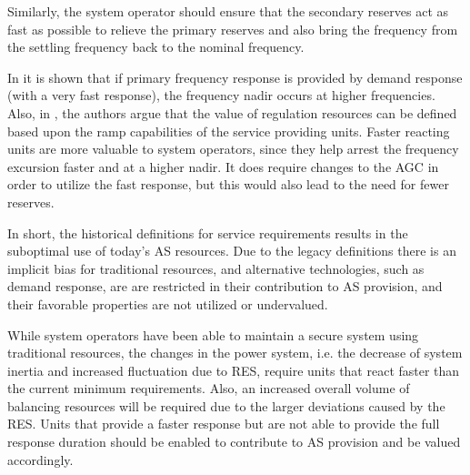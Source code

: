 Similarly, the system operator should ensure that the secondary reserves act as fast as possible to relieve the primary reserves and also bring the frequency from the settling frequency back to the nominal frequency.


In \cite{vrettos2015integrating} it is shown that if primary frequency response is provided by demand response (with a very fast response), the frequency nadir occurs at higher frequencies.
Also, in \cite{makarov2008assessing}, the authors argue that the value of regulation resources can be defined based upon the ramp capabilities of the service providing units. Faster reacting units are more valuable to system operators, since they help arrest the frequency excursion faster and at a higher nadir. It does require changes to the AGC in order to utilize the fast response, but this would also lead to the need for fewer reserves.

In short, the historical definitions for service requirements results in the suboptimal use of today's AS resources. Due to the legacy definitions there is an implicit %
bias for traditional resources, and alternative technologies, such as demand response, are are restricted in their contribution to AS provision, and their favorable properties are not utilized or undervalued.

While system operators have been able to maintain a secure system using traditional resources, the changes in the power system, i.e. the decrease of system inertia and increased fluctuation due to RES, require units that react faster than the current minimum requirements. Also, an increased overall volume of balancing resources will be required due to the larger deviations caused by the RES.
Units that provide a faster response but are not able to provide the full response duration should be enabled to contribute to AS provision and be valued accordingly.

